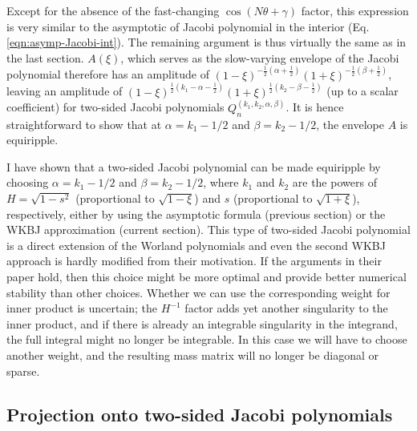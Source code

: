 %
Except for the absence of the fast-changing $\cos(N\theta + \gamma)$ factor, this expression is very similar to the asymptotic of Jacobi polynomial in the interior (Eq. \ref{eqn:asymp-Jacobi-int}). The remaining argument is thus virtually the same as in the last section. 
$A(\xi)$, which serves as the slow-varying envelope of the Jacobi polynomial therefore has an amplitude of $(1 - \xi)^{-\frac{1}{2}(\alpha + \frac{1}{2})} (1 + \xi)^{-\frac{1}{2}(\beta + \frac{1}{2})}$, leaving an amplitude of $(1 - \xi)^{\frac{1}{2}(k_1 - \alpha - \frac{1}{2})} (1 + \xi)^{\frac{1}{2}(k_2 - \beta - \frac{1}{2})}$ (up to a scalar coefficient) for two-sided Jacobi polynomials $Q_n^{(k_1, k_2, \alpha, \beta)}$. It is hence straightforward to show that at $\alpha = k_1 - 1/2$ and $\beta = k_2 - 1/2$, the envelope $A$ is equiripple.

I have shown that a two-sided Jacobi polynomial can be made equiripple by choosing $\alpha = k_1 - 1/2$ and $\beta = k_2 - 1/2$, where $k_1$ and $k_2$ are the powers of $H = \sqrt{1 - s^2}$ (proportional to $\sqrt{1 - \xi}$) and $s$ (proportional to $\sqrt{1 + \xi}$), respectively, either by using the asymptotic formula (previous section) or the WKBJ approximation (current section). 
This type of two-sided Jacobi polynomial is a direct extension of the Worland polynomials \citep{livermore_spectral_2007} and even the second WKBJ approach is hardly modified from their motivation. If the arguments in their paper hold, then this choice might be more optimal and provide better numerical stability than other choices. Whether we can use the corresponding weight for inner product is uncertain; the $H^{-1}$ factor adds yet another singularity to the inner product, and if there is already an integrable singularity in the integrand, the full integral might no longer be integrable. In this case we will have to choose another weight, and the resulting mass matrix will no longer be diagonal or sparse.


\subsection{Projection onto two-sided Jacobi polynomials}

